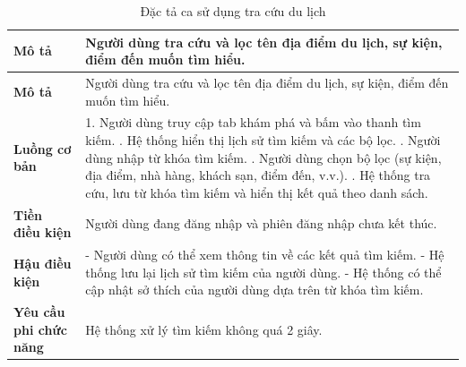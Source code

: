 \begin{longtable}{| p{4cm} | p{\dimexpr\linewidth-4cm-4\tabcolsep} |} %
    \caption{Đặc tả ca sử dụng tra cứu du lịch} %
    \label{tab:uc_search_spec} \\ %

    \hline
    \textbf{Mô tả} & Người dùng tra cứu và lọc tên địa điểm du lịch, sự kiện, điểm đến muốn tìm hiểu. \\
    \hline
    \endfirsthead %

    \hline
    \textbf{Mô tả} & Người dùng tra cứu và lọc tên địa điểm du lịch, sự kiện, điểm đến muốn tìm hiểu. \\
    \hline
    \endhead

    \hline 
    \endfoot

    \hline %
    \endlastfoot

    \textbf{Luồng cơ bản} & 1. Người dùng truy cập tab khám phá và bấm vào thanh tìm kiếm. \newline
                           2. Hệ thống hiển thị lịch sử tìm kiếm và các bộ lọc. \newline
                           3. Người dùng nhập từ khóa tìm kiếm. \newline
                           4. Người dùng chọn bộ lọc (sự kiện, địa điểm, nhà hàng, khách sạn, điểm đến, v.v.). \newline
                           5. Hệ thống tra cứu, lưu từ khóa tìm kiếm và hiển thị kết quả theo danh sách. \\
    \hline
    \textbf{Tiền điều kiện} & Người dùng đang đăng nhập và phiên đăng nhập chưa kết thúc. \\
    \hline
    \textbf{Hậu điều kiện} & - Người dùng có thể xem thông tin về các kết quả tìm kiếm.\newline
                           - Hệ thống lưu lại lịch sử tìm kiếm của người dùng. \newline
                           - Hệ thống có thể cập nhật sở thích của người dùng dựa trên từ khóa tìm kiếm. \\
    \hline
    \textbf{Yêu cầu phi chức năng} & Hệ thống xử lý tìm kiếm không quá 2 giây. \\

\end{longtable}

